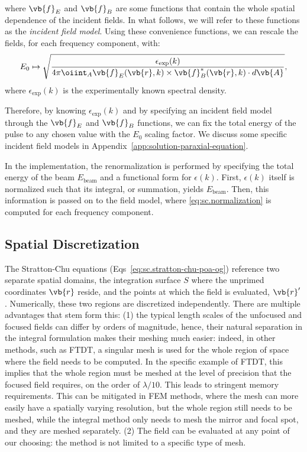 \documentclass[11pt,SymmetricalJury]{inrsthesis/inrsthesis}
\begin{document}
where $\vb{f}_E$ and $\vb{f}_B$ are some functions that contain the whole
spatial dependence of the incident fields. In what follows, we will refer to
these functions as the \textit{incident field model}. Using these convenience
functions, we can rescale the fields, for each frequency component, with:
  \begin{equation}
    E_0 \mapsto \sqrt{%
      \frac{\epsilon_\text{exp}(k)}
           {4\pi\oiint_A\real{\vb{f}_E(\vb{r},k)\times\vb{f}_B^*(\vb{r},k)}\cdot d\vb{A}}
    },
    \label{eq:sc.normalization}
  \end{equation}
where $\epsilon_\text{exp}(k)$ is the experimentally known spectral density.

Therefore, by knowing $\epsilon_\text{exp}(k)$ and by specifying an incident
field model through the $\vb{f}_E$ and $\vb{f}_B$ functions, we can fix the
total energy of the pulse to any chosen value with the $E_0$ scaling factor. We
discuss some specific incident field models in
Appendix~\ref{app:solution-paraxial-equation}.

In the implementation, the renormalization is performed by specifying the total
energy of the beam $E_\text{beam}$ and a functional form for $\epsilon(k)$.
First, $\epsilon(k)$ itself is normalized such that its integral, or summation,
yields $E_\text{beam}$. Then, this information is passed on to the field model,
where
\eqref{eq:sc.normalization} is computed for each frequency
component.

\subsection{Spatial Discretization}

The Stratton-Chu equations (Eqs~\eqref{eq:sc.stratton-chu-poa-og}) reference two
separate spatial domains, the integration surface $S$ where the unprimed
coordinates $\vb{r}$ reside, and the points at which the field is evaluated,
$\vb{r}'$. Numerically, these two regions are discretized independently. There
are multiple advantages that stem form this: (1) the typical length scales of
the unfocused and focused fields can differ by orders of magnitude, hence, their
natural separation in the integral formulation makes their meshing much easier:
indeed, in other methods, such as FTDT, a singular mesh is used for the whole
region of space where the field needs to be computed. In the specific example of
FTDT, this implies that the whole region must be meshed at the level of
precision that the focused field requires, on the order of $\lambda/10$. This
leads to stringent memory requirements. This can be mitigated in FEM methods,
where the mesh can more easily have a spatially varying resolution, but the
whole region still needs to be meshed, while the integral method only needs to
mesh the mirror and focal spot, and they are meshed separately. (2) The field
can be evaluated at any point of our choosing: the method is not limited to a
specific type of mesh.
\end{document}
